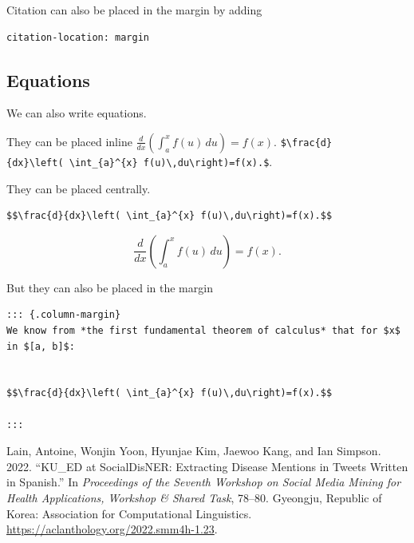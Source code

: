 \documentclass[
  letterpaper,
  DIV=11,
  numbers=noendperiod,
  oneside]{scrartcl}
\newlength{\cslhangindent}
\newlength{\cslentryspacingunit} %
\newenvironment{CSLReferences}[2] %
 {%
  \setlength{\parindent}{0pt}
  \ifodd #1
  \let\oldpar\par
  \def\par{\hangindent=\cslhangindent\oldpar}
  \fi
  \setlength{\parskip}{#2\cslentryspacingunit}
 }%
 {}
\begin{document}
Citation can also be placed in the margin by adding

\begin{verbatim}
citation-location: margin
\end{verbatim}

\hypertarget{equations}{%
\subsection{Equations}\label{equations}}

We can also write equations.

They can be placed inline
\(\frac{d}{dx}\left( \int_{a}^{x} f(u)\,du\right)=f(x).\)
\texttt{\$\textbackslash{}frac\{d\}\{dx\}\textbackslash{}left(\ \textbackslash{}int\_\{a\}\^{}\{x\}\ f(u)\textbackslash{},du\textbackslash{}right)=f(x).\$}.

They can be placed centrally.

\begin{verbatim}
$$\frac{d}{dx}\left( \int_{a}^{x} f(u)\,du\right)=f(x).$$
\end{verbatim}

\[\frac{d}{dx}\left( \int_{a}^{x} f(u)\,du\right)=f(x).\]

But they can also be placed in the margin

\begin{verbatim}
::: {.column-margin}
We know from *the first fundamental theorem of calculus* that for $x$ in $[a, b]$:


$$\frac{d}{dx}\left( \int_{a}^{x} f(u)\,du\right)=f(x).$$

:::
\end{verbatim}


\hypertarget{refs}{}
\begin{CSLReferences}{1}{0}
\leavevmode{}%
Lain, Antoine, Wonjin Yoon, Hyunjae Kim, Jaewoo Kang, and Ian Simpson.
2022. {``{KU}{\_}{ED} at {S}ocial{D}is{NER}: Extracting Disease Mentions
in Tweets Written in {S}panish.''} In \emph{Proceedings of the Seventh
Workshop on Social Media Mining for Health Applications, Workshop {\&}
Shared Task}, 78--80. Gyeongju, Republic of Korea: Association for
Computational Linguistics.
\url{https://aclanthology.org/2022.smm4h-1.23}.

\end{CSLReferences}
\end{document}
